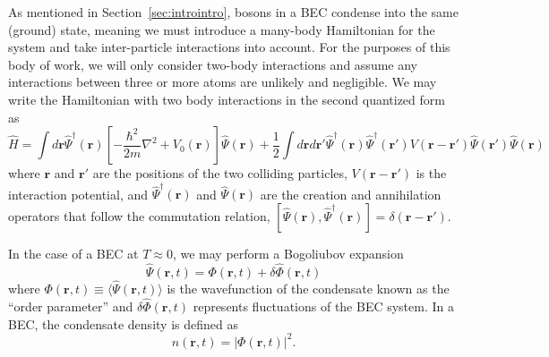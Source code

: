 As mentioned in Section~\ref{sec:introintro}, bosons in a BEC condense into the same (ground) state, meaning we must introduce a many-body Hamiltonian for the system and take inter-particle interactions into account.
For the purposes of this body of work, we will only consider two-body interactions and assume any interactions between three or more atoms are unlikely and negligible.
We may write the Hamiltonian with two body interactions in the second quantized form as
\begin{equation}
    \hat H = \int d\mathbf{r} \hat \Psi^\dagger(\mathbf{r})\left[-\frac{\hbar^2}{2m}\nabla^2 + V_0(\mathbf{r}) \right]\hat \Psi(\mathbf{r}) + \frac{1}{2} \int d\mathbf{r} d\mathbf{r'} \hat \Psi^\dagger(\mathbf{r}) \hat \Psi^\dagger(\mathbf{r'}) V(\mathbf{r} - \mathbf{r'})\hat \Psi(\mathbf{r'}) \hat \Psi(\mathbf{r})
    \label{eqn:2nd}
\end{equation}
where $\mathbf{r}$ and $\mathbf{r'}$ are the positions of the two colliding particles, $V(\mathbf{r}-\mathbf{r'})$ is the interaction potential, and $\hat \Psi^\dagger(\mathbf{r})$ and $\hat \Psi(\mathbf{r})$ are the creation and annihilation operators that follow the commutation relation, $[\hat \Psi(\mathbf{r}),\hat \Psi^\dagger(\mathbf{r})] = \delta(\mathbf{r} - \mathbf{r'})$.

In the case of a BEC at $T\approx0$, we may perform a Bogoliubov expansion~\cite{Bogoliubov1947, Dalfovo1999}
\begin{equation}
    \hat \Psi (\mathbf{r}, t) = \Phi(\mathbf{r},t) + \delta \hat \Phi(\mathbf{r},t)
\label{eqn:bog}
\end{equation}
where $\Phi(\mathbf{r},t) \equiv \langle \hat \Psi(\mathbf{r},t) \rangle$ is the wavefunction of the condensate known as the ``order parameter'' and $\delta \hat \Phi(\mathbf{r},t)$ represents fluctuations of the BEC system.
In a BEC, the condensate density is defined as
\begin{equation}
    n(\mathbf{r},t) = |\Phi(\mathbf{r},t)|^2.
\end{equation}

